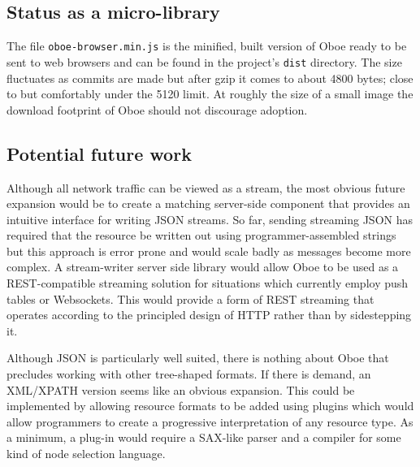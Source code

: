 \documentclass[12pt, ]{article}
\begin{document}
\subsection{Status as a micro-library}\label{status-as-a-micro-library}

The file \texttt{oboe-browser.min.js} is the minified, built version of
Oboe ready to be sent to web browsers and can be found in the project's
\texttt{dist} directory. The size fluctuates as commits are made but
after gzip it comes to about 4800 bytes; close to but comfortably under
the 5120 limit. At roughly the size of a small image the download
footprint of Oboe should not discourage adoption.

\subsection{Potential future work}\label{potential-future-work}

Although all network traffic can be viewed as a stream, the most obvious
future expansion would be to create a matching server-side component
that provides an intuitive interface for writing JSON streams. So far,
sending streaming JSON has required that the resource be written out
using programmer-assembled strings but this approach is error prone and
would scale badly as messages become more complex. A stream-writer
server side library would allow Oboe to be used as a REST-compatible
streaming solution for situations which currently employ push tables or
Websockets. This would provide a form of REST streaming that operates
according to the principled design of HTTP rather than by sidestepping
it.

Although JSON is particularly well suited, there is nothing about Oboe
that precludes working with other tree-shaped formats. If there is
demand, an XML/XPATH version seems like an obvious expansion. This could
be implemented by allowing resource formats to be added using plugins
which would allow programmers to create a progressive interpretation of
any resource type. As a minimum, a plug-in would require a SAX-like
parser and a compiler for some kind of node selection language.
\end{document}
